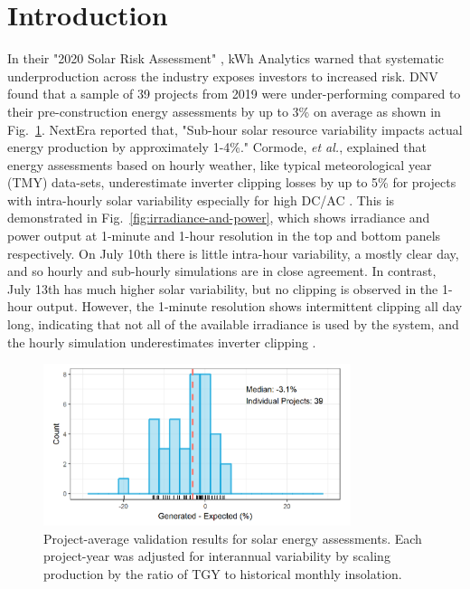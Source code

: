\documentclass[conference]{IEEEtran}
\begin{document}
\section{Introduction}
In their "2020 Solar Risk Assessment" \cite{Matsui2020}, kWh Analytics warned that systematic underproduction across the industry exposes investors to increased risk. DNV found that a sample of 39 projects from 2019 were under-performing compared to their pre-construction energy assessments by up to 3\% on average as shown in Fig.~\ref{fig:project-underperformance}. NextEra reported that, "Sub-hour solar resource variability impacts actual energy production by approximately 1-4\%." Cormode, \textit{et al.}, explained that energy assessments based on hourly weather, like typical meteorological year (TMY) data-sets, underestimate inverter clipping losses by up to 5\% for projects with intra-hourly solar variability especially for high DC/AC \cite{Cormode2019}. This is demonstrated in Fig.~\ref{fig:irradiance-and-power}, which shows irradiance and power output at 1-minute and 1-hour resolution in the top and bottom panels respectively. On July 10th there is little intra-hour variability, a mostly clear day, and so hourly and sub-hourly simulations are in close agreement. In contrast, July 13th has much higher solar variability, but no clipping is observed in the 1-hour output. However, the 1-minute resolution shows intermittent clipping all day long, indicating that not all of the available irradiance is used by the system, and the hourly simulation underestimates inverter clipping \cite{Kharait}.

\begin{figure}[htbp]
\centerline{\includegraphics[width=9cm]{fig1.png}}
\caption{Project-average validation results for solar energy assessments. Each project-year was adjusted for interannual variability by scaling production by the ratio of TGY to historical monthly insolation.}
\label{fig:project-underperformance}
\end{figure}
\end{document}
